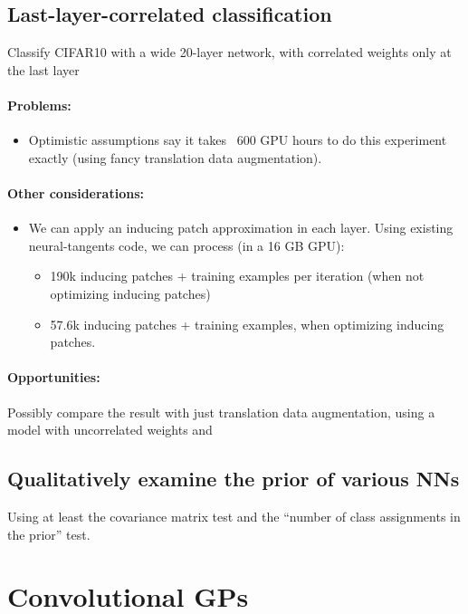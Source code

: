 \documentclass{article} %
\begin{document}
\subsection{Last-layer-correlated classification}
Classify CIFAR10 with a wide 20-layer network, with correlated weights only at
the last layer

\paragraph{Problems:}
\begin{itemize}
\item Optimistic assumptions say it takes ~600 GPU hours to do this experiment
  exactly (using fancy translation data augmentation).
\end{itemize}

\paragraph{Other considerations:}
\begin{itemize}
  \item We can apply an inducing patch approximation in each layer. Using
    existing neural-tangents code, we can process (in a 16 GB GPU):
    \begin{itemize}
      \item 190k inducing patches + training examples per iteration (when not
        optimizing inducing patches)
      \item 57.6k inducing patches + training examples, when optimizing inducing
        patches.
    \end{itemize}
\end{itemize}

\paragraph{Opportunities:}
Possibly compare the result with just translation data augmentation, using a
model with uncorrelated weights and

\subsection{Qualitatively examine the prior of various NNs}
Using at least the covariance matrix test and the ``number of class assignments
in the prior'' test.

\section{Convolutional GPs}
\end{document}
